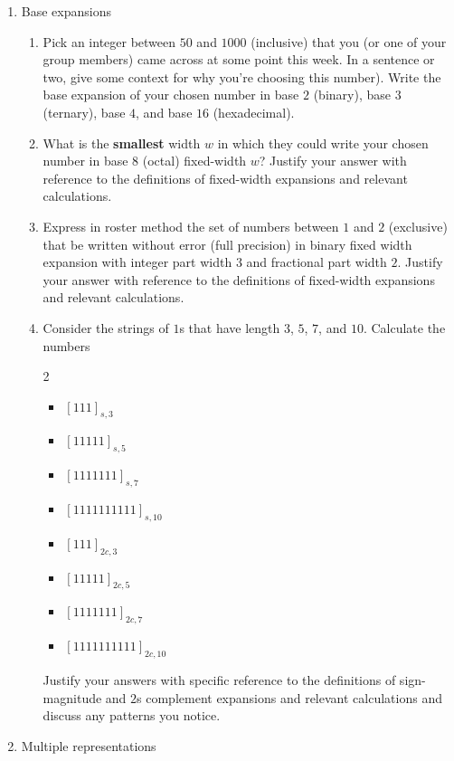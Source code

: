 \documentclass[12pt, oneside]{article}
\begin{document}
\begin{enumerate}[labelindent=0pt, leftmargin=0pt]
\item Base expansions
    \begin{enumerate}
        \item Pick an integer between $50$ and $1000$ (inclusive) that you (or one of your
        group members) came across at some point this week. 
        In a sentence or two, give some context for why you're choosing this number). 
        Write the base expansion of your chosen number in base $2$ (binary), base $3$ (ternary), base $4$, and base $16$ (hexadecimal).
        \item What is the {\bf smallest} width $w$ in which they could write your chosen number in base $8$ (octal) 
        fixed-width $w$? Justify your answer with reference to the definitions of fixed-width expansions and relevant calculations.
        \item Express in roster method the set of numbers between $1$ and $2$ (exclusive) that be written without error 
        (full precision)
        in binary fixed width expansion with integer part width $3$ and fractional part width $2$. Justify your answer with 
        reference to the definitions of fixed-width expansions and relevant calculations.
        \item Consider the strings of $1$s that have length $3$, $5$, $7$, and $10$.
        Calculate the numbers 
        \begin{multicols}{2}
            \begin{itemize}
            \item[] $[111]_{s,3}$
            \item[] $[11111]_{s,5}$
            \item[] $[1111111]_{s,7}$
            \item[] $[1111111111]_{s,10}$
            \item[] $[111]_{2c,3}$
            \item[] $[11111]_{2c,5}$
            \item[] $[1111111]_{2c,7}$
            \item[] $[1111111111]_{2c,10}$
            \end{itemize}
        \end{multicols}
        Justify your answers with specific reference to the definitions of sign-magnitude and $2$s complement expansions and relevant calculations and discuss any patterns you notice.
    \end{enumerate}

\item Multiple representations


\end{enumerate}
\end{document}
